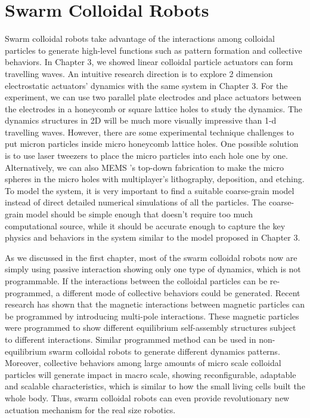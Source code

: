 \section{Swarm Colloidal Robots}
Swarm colloidal robots take advantage of the interactions among colloidal particles to generate high-level functions such as pattern formation and collective behaviors. In Chapter 3, we showed linear colloidal particle actuators can form travelling waves. An intuitive research direction is to explore 2 dimension electrostatic actuators' dynamics with the same system in Chapter 3. For the experiment, we can use two parallel plate electrodes and place actuators between the electrodes in a honeycomb or square lattice  holes to study the dynamics. The dynamics structures in 2D will be much more visually impressive than  1-d travelling waves. However,  there are some experimental technique challenges to put micron particles  inside micro honeycomb lattice holes. One possible solution is to use laser tweezers to place the micro particles into each hole one by one. Alternatively, we can also MEMS 's top-down fabrication to make the micro spheres in the micro holes with multiplayer's lithography, deposition, and etching. To model the system, it is very important to find a suitable coarse-grain model instead of direct detailed numerical simulations of all the particles. The coarse-grain model should be simple enough that doesn't require too much computational source, while it should be accurate enough to capture the key physics and  behaviors in the system similar to the model proposed in Chapter 3.

As we discussed in the first chapter, most of the swarm colloidal robots now are simply using passive interaction showing only one type of dynamics, which is not programmable. If the interactions between the colloidal particles can be re-programmed, a different mode of collective behaviors could be generated. Recent research has shown that the magnetic interactions between magnetic particles   can be programmed by introducing multi-pole interactions. These magnetic particles were programmed to show  different  equilibrium self-assembly structures subject to different interactions\autocite{niu2019magnetic}. Similar programmed method can be used in non-equilibrium swarm colloidal robots to generate different dynamics patterns. Moreover, collective behaviors among large amounts of micro scale colloidal particles  will generate impact in macro scale,  showing reconfigurable, adaptable and scalable  characteristics,  which is similar to  how the small living cells built the whole body. Thus, swarm colloidal robots can even provide revolutionary new actuation mechanism for the real size robotics. 
